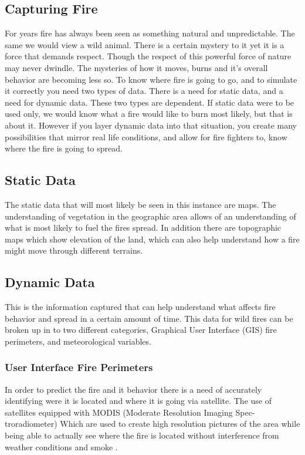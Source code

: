 \documentclass[sigconf]{acmart}
\begin{document}
\subsection{Capturing Fire}
For years fire has always been seen as something natural and 
unpredictable.  The same we would view a wild animal.  There is a 
certain mystery to it yet it is a force that demands respect.  Though 
the respect of this powerful force of nature may never dwindle.  The 
mysteries of how it moves, burns and it's overall behavior are becoming 
less so.
To know where fire is going to go, and to simulate it correctly you 
need two types of data.  There is a need for static data, and a need 
for dynamic data. These two types are dependent.  If static data were 
to be used only, we would know what a fire would like to burn most 
likely, but that is about it.  However if you layer dynamic data into 
that situation, you create many possibilities that mirror real life 
conditions, and allow for fire fighters to, know where the fire is 
going to spread.
\subsection{Static Data} 
The static data that will most likely be seen in this instance are 
maps.  The understanding of vegetation in the geographic area allows of 
an understanding of what is most likely to fuel the fires spread.  In 
addition there are topographic maps which show elevation of the land, 
which can also help understand how a fire might move through different 
terrains.
\subsection{Dynamic Data}
This is the information captured that can help understand what affects 
fire behavior and spread in a certain amount of time. This data for 
wild fires can be broken up in to two different categories, Graphical 
User Interface (GIS) fire perimeters, and meteorological variables.
\subsubsection{User Interface Fire Perimeters}
In order to predict the fire and it behavior there is a need of 
accurately identifying were it is located and where it is going via 
satellite.  The use of satellites equipped with  MODIS (Moderate 
Resolution Imaging Spec-troradiometer)  Which are used to create high 
resolution pictures of the area while being able to actually see where 
the fire is located without interference from weather conditions and 
smoke \cite{BRUN}.
\end{document}
